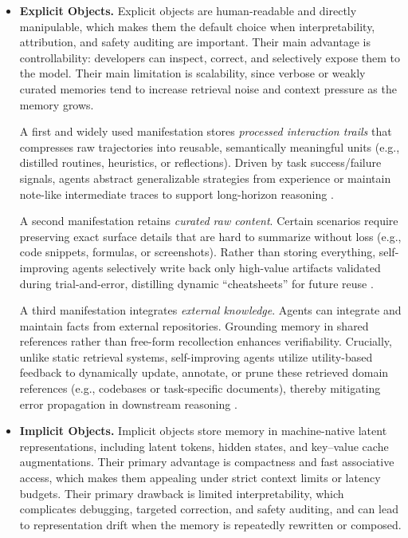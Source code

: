 \documentclass{article}
\begin{document}
\begin{itemize}[leftmargin=*]
    \item \textbf{Explicit Objects.}
    Explicit objects are human-readable and directly manipulable, which makes them the default choice when interpretability, attribution, and safety auditing are important. Their main advantage is controllability: developers can inspect, correct, and selectively expose them to the model. Their main limitation is scalability, since verbose or weakly curated memories tend to increase retrieval noise and context pressure as the memory grows.

    A first and widely used manifestation stores \textit{processed interaction trails} that compresses raw trajectories into reusable, semantically meaningful units (e.g., distilled routines, heuristics, or reflections). Driven by task success/failure signals, agents abstract generalizable strategies from experience or maintain note-like intermediate traces to support long-horizon reasoning \citep{wang2024agentworkflowmemory, ouyang2025reasoningbankscalingagentselfevolving, lanchantin2023learningreasonmemorizeselfnotes, lee2024humaninspiredreadingagentgist, long2025seeinglisteningrememberingreasoning}.


    A second manifestation retains \textit{curated raw content}. Certain scenarios require preserving exact surface details that are hard to summarize without loss (e.g., code snippets, formulas, or screenshots). Rather than storing everything, self-improving agents selectively write back only high-value artifacts validated during trial-and-error, distilling dynamic ``cheatsheets'' for future reuse \citep{zhao2024expel, suzgun2025dynamiccheatsheettesttimelearning}.

    A third manifestation integrates \textit{external knowledge}. Agents can integrate and  maintain facts from external repositories. Grounding memory in shared references rather than free-form recollection  enhances verifiability. Crucially, unlike static retrieval systems, self-improving agents utilize utility-based feedback to dynamically update, annotate, or prune these retrieved domain references (e.g., codebases or task-specific documents), thereby mitigating error propagation in downstream reasoning \citep{tran2025primeplanningretrievalintegratedmemory, zhang-etal-2024-codeagent, peng2023checkfactstryagain}.


    \item \textbf{Implicit Objects.} Implicit objects store memory in machine-native latent representations, including latent tokens, hidden states, and key--value cache augmentations. Their primary advantage is compactness and fast associative access, which makes them appealing under strict context limits or latency budgets. Their primary drawback is limited interpretability, which complicates debugging, targeted correction, and safety auditing, and can lead to representation drift when the memory is repeatedly rewritten or composed.



\end{itemize}
\end{document}
